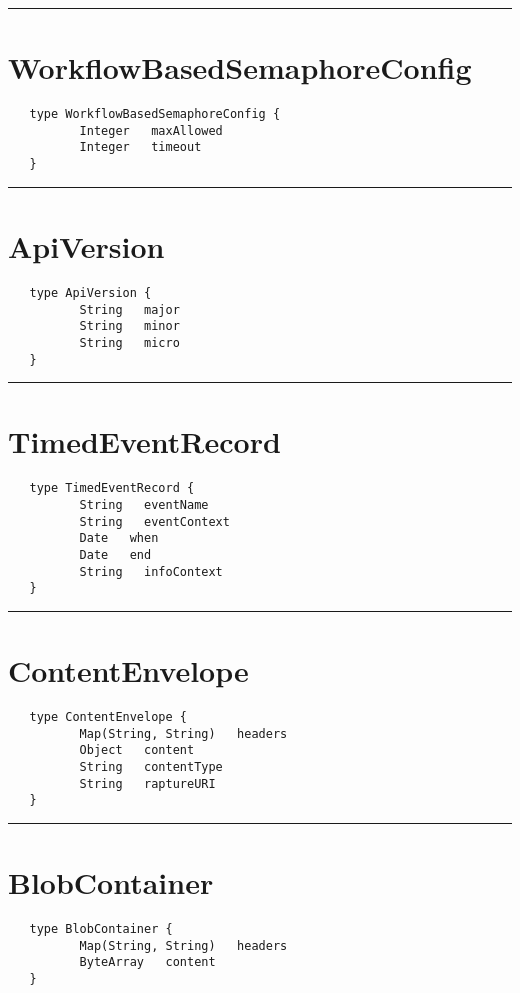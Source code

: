 \rule{15cm}{2pt}
\section{WorkflowBasedSemaphoreConfig}
\label{type:WorkflowBasedSemaphoreConfig}

\begin{verbatim}
   type WorkflowBasedSemaphoreConfig {
          Integer   maxAllowed
          Integer   timeout
   }
\end{verbatim}

\rule{15cm}{2pt}
\section{ApiVersion}
\label{type:ApiVersion}

\begin{verbatim}
   type ApiVersion {
          String   major
          String   minor
          String   micro
   }
\end{verbatim}

\rule{15cm}{2pt}
\section{TimedEventRecord}
\label{type:TimedEventRecord}

\begin{verbatim}
   type TimedEventRecord {
          String   eventName
          String   eventContext
          Date   when
          Date   end
          String   infoContext
   }
\end{verbatim}

\rule{15cm}{2pt}
\section{ContentEnvelope}
\label{type:ContentEnvelope}

\begin{verbatim}
   type ContentEnvelope {
          Map(String, String)   headers
          Object   content
          String   contentType
          String   raptureURI
   }
\end{verbatim}

\rule{15cm}{2pt}
\section{BlobContainer}
\label{type:BlobContainer}

\begin{verbatim}
   type BlobContainer {
          Map(String, String)   headers
          ByteArray   content
   }
\end{verbatim}

